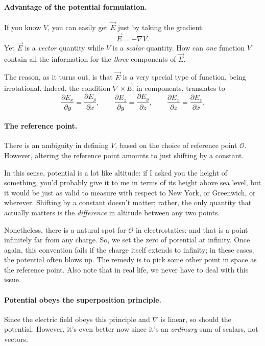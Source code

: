 \paragraph{Advantage of the potential formulation.} If you know $V$, you can easily get $\vec{E}$ just by taking the gradient:
\[\vec{E}=-\nabla V.\]
Yet $\vec{E}$ is a \textit{vector} quantity while $V$ is a \textit{scalar} quantity. How can \textit{one} function $V$ contain all the information for the \textit{three} components of $\vec{E}$.

The reason, as it turns out, is that $\vec{E}$ is a very special type of function, being irrotational. Indeed, the condition $\nabla\times \vec{E}$, in components, translates to
\[\frac{\partial E_x}{\partial y}=\frac{\partial E_y}{\partial x}, \qquad \frac{\partial E_z}{\partial y}=\frac{\partial E_y}{\partial z}, \qquad \frac{\partial E_x}{\partial z}=\frac{\partial E_z}{\partial x}.\]

\paragraph{The reference point.} There is an ambiguity in defining $V$, based on the choice of reference point $\mathcal{O}$. However, altering the reference point amounts to just shifting by a constant. 

In this sense, potential is a lot like altitude: if I asked you the height of something, you'd probably give it to me in terms of its height above sea level, but it would be just as valid to measure with respect to New York, or Greenwich, or wherever. Shifting by a constant doesn't matter; rather, the only quantity that actually matters is the \textit{difference} in altitude between any two points.

Nonetheless, there is a natural spot for $\mathcal{O}$ in electrostatics: and that is a point infinitely far from any charge. So, we set the zero of potential at infinity. Once again, this convention fails if the charge itself extends to infinity; in these cases, the potential often blows up. The remedy is to pick some other point in space as the reference point. Also note that in real life, we never have to deal with this issue.

\paragraph{Potential obeys the superposition principle.} Since the electric field obeys this principle and $\nabla$ is linear, so should the potential. However, it's even better now since it's an \textit{ordinary} sum of scalars, not vectors.

